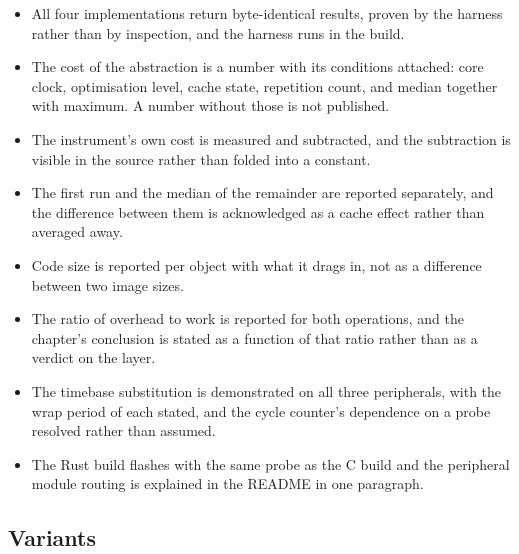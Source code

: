 \begin{itemize}
\item All four implementations return byte-identical results, proven by the
harness rather than by inspection, and the harness runs in the build.
\item The cost of the abstraction is a number with its conditions attached: core
clock, optimisation level, cache state, repetition count, and median together
with maximum. A number without those is not published.
\item The instrument's own cost is measured and subtracted, and the subtraction
is visible in the source rather than folded into a constant.
\item The first run and the median of the remainder are reported separately, and
the difference between them is acknowledged as a cache effect rather than
averaged away.
\item Code size is reported per object with what it drags in, not as a
difference between two image sizes.
\item The ratio of overhead to work is reported for both operations, and the
chapter's conclusion is stated as a function of that ratio rather than as a
verdict on the layer.
\item The timebase substitution is demonstrated on all three peripherals, with
the wrap period of each stated, and the cycle counter's dependence on a probe
resolved rather than assumed.
\item The Rust build flashes with the same probe as the C build and the
peripheral module routing is explained in the README in one paragraph.
\end{itemize}

\subsection*{Variants}

